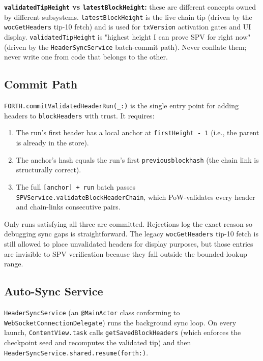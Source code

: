 \documentclass[a4paper, 11pt, openany]{book}
\begin{document}
\begin{notebox}
\textbf{\texttt{validated\-Tip\-Height} vs \texttt{latest\-Block\-Height}:} these are different concepts owned by different subsystems. \texttt{latest\-Block\-Height} is the live chain tip (driven by the \texttt{wocGetHeaders} tip-10 fetch) and is used for \texttt{tx\-Version} activation gates and UI display. \texttt{validated\-Tip\-Height} is "highest height I can prove SPV for right now" (driven by the \texttt{Header\-Sync\-Service} batch-commit path). Never conflate them; never write one from code that belongs to the other.
\end{notebox}

\subsection{Commit Path}

\texttt{FORTH.com\-mit\-Val\-i\-dated\-Head\-er\-Run(\_:)} is the single entry point for adding headers to \texttt{blockHeaders} with trust. It requires:

\begin{enumerate}
\item The run's first header has a local anchor at \texttt{firstHeight - 1} (i.e., the parent is already in the store).
\item The anchor's hash equals the run's first \texttt{previousblockhash} (the chain link is structurally correct).
\item The full \texttt{[anchor] + run} batch passes \texttt{SPV\-Service.validate\-Block\-Header\-Chain}, which PoW-validates every header and chain-links consecutive pairs.
\end{enumerate}

Only runs satisfying all three are committed. Rejections log the exact reason so debugging sync gaps is straightforward. The legacy \texttt{\allowbreak wocGetHeaders} tip-10 fetch is still allowed to place unvalidated headers for display purposes, but those entries are invisible to SPV verification because they fall outside the bounded-lookup range.

\subsection{Auto-Sync Service}

\texttt{Header\-Sync\-Service} (an \texttt{@MainActor} class conforming to \texttt{Web\-Socket\-Connection\-Delegate}) runs the background sync loop. On every launch, \texttt{ContentView.task} calls \texttt{getSavedBlockHeaders} (which enforces the checkpoint seed and recomputes the validated tip) and then \texttt{Header\-Sync\-Service.shared.resume(forth:)}.
\end{document}
